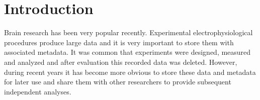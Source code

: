 \documentclass[conference]{IEEEtran}
\begin{document}
%




%
\IEEEpeerreviewmaketitle



\section{Introduction}
Brain research has been very popular recently. Experimental electrophysiological procedures produce large data and it is very important to store them with associated metadata. It was common that experiments were designed, measured and analyzed and after evaluation this recorded data was deleted. However, during recent years it has become more obvious to store these data and metadata for later use and share them with other researchers to provide subsequent independent analyses.
\end{document}
